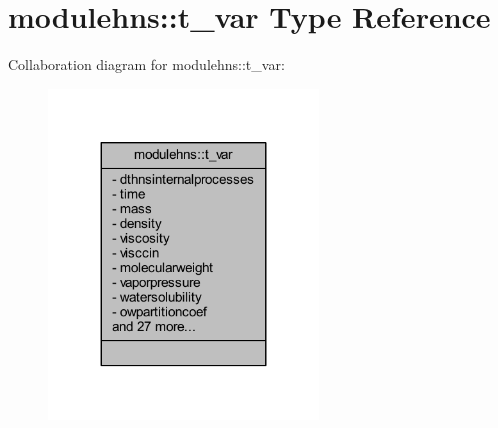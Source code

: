 \hypertarget{structmodulehns_1_1t__var}{}\section{modulehns\+:\+:t\+\_\+var Type Reference}
\label{structmodulehns_1_1t__var}


Collaboration diagram for modulehns\+:\+:t\+\_\+var\+:\nopagebreak
\begin{figure}[H]
\begin{center}
\leavevmode
\includegraphics[width=203pt]{structmodulehns_1_1t__var__coll__graph}
\end{center}
\end{figure}
